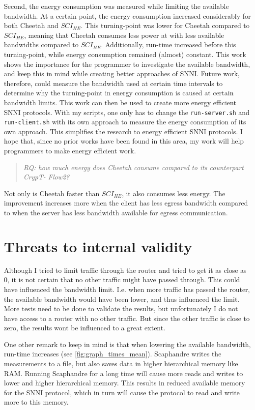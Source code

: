 \documentclass[../thesis.tex]{subfiles}
\begin{document}
Second, the energy consumption was measured while limiting the available bandwidth. At a certain point, the energy consumption increased considerably for both Cheetah and $SCI_{HE}$. This turning-point was lower for Cheetah compared to $SCI_{HE}$, meaning that Cheetah consumes less power at with less available bandwidths compared to $SCI_{HE}$. Additionally, run-time increased before this turning-point, while energy consumption remained (almost) constant. This work shows the importance for the programmer to investigate the available bandwidth, and keep this in mind while creating better approaches of SNNI. Future work, therefore, could measure the bandwidth used at certain time intervals to determine why the turning-point in energy consumption is caused at certain bandwidth limits. This work can then be used to create more energy efficient SNNI protocols. With my scripts, one only has to change the \verb|run-server.sh| and \verb|run-client.sh| with its own approach to measure the energy consumption of its own approach. This simplifies the research to energy efficient SNNI protocols. I hope that, since no prior works have been found in this area, my work will help programmers to make energy efficient work.

\begin{quote}
    \emph{RQ: how much energy does Cheetah consume compared to its counterpart CrypT-
Flow2?}
\end{quote}
Not only is Cheetah faster than $SCI_{HE}$, it also consumes less energy. The improvement increases more when the client has less egress bandwidth compared to when the server has less bandwidth available for egress communication.

\section{Threats to internal validity}
Although I tried to limit traffic through the router and tried to get it as close as 0, it is not certain that no other traffic might have passed through. This could have influenced the bandwidth limit. I.e. when more traffic has passed the router, the available bandwidth would have been lower, and thus influenced the limit. More tests need to be done to validate the results, but unfortunately I do not have access to a router with no other traffic. But since the other traffic is close to zero, the results wont be influenced to a great extent.

One other remark to keep in mind is that when lowering the available bandwidth, run-time increases (see \autoref{fig:graph_times_mean}). Scaphandre writes the measurements to a file, but also saves data in higher hierarchical memory like RAM. Running Scaphandre for a long time will cause more reads and writes to lower and higher hierarchical memory. This results in reduced available memory for the SNNI protocol, which in turn will cause the protocol to read and write more to this memory. 
\end{document}
